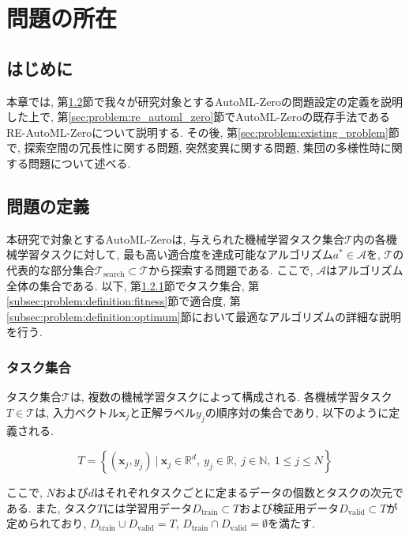\documentclass[11pt,oneside,openany,report]{jsbook}
\begin{document}
\chapter{問題の所在}\label{chap:problem}

\section{はじめに} \label{sec:problem:introduction}
本章では, 第\ref{sec:problem:definition}節で我々が研究対象とするAutoML-Zeroの問題設定の定義を説明した上で, 第\ref{sec:problem:re_automl_zero}節でAutoML-Zeroの既存手法であるRE-AutoML-Zeroについて説明する. その後, 第\ref{sec:problem:existing_problem}節で, 探索空間の冗長性に関する問題, 突然変異に関する問題, 集団の多様性時に関する問題について述べる.

\section{問題の定義} \label{sec:problem:definition}

本研究で対象とするAutoML-Zeroは, 与えられた機械学習タスク集合$\mathcal{T}$内の各機械学習タスクに対して, 最も高い適合度を達成可能なアルゴリズム$a^\ast \in \mathcal{A}$を, $\mathcal{T}$の代表的な部分集合$\mathcal{T}_\mathrm{search} \subset \mathcal{T}$から探索する問題である. ここで, $\mathcal{A}$はアルゴリズム全体の集合である. 以下, 第\ref{subsec:problem:definition:tasksets}節でタスク集合, 第\ref{subsec:problem:definition:fitness}節で適合度, 第\ref{subsec:problem:definition:optimum}節において最適なアルゴリズムの詳細な説明を行う.

\subsection{タスク集合}\label{subsec:problem:definition:tasksets}

タスク集合$\mathcal{T}$は, 複数の機械学習タスクによって構成される. 各機械学習タスク$T \in \mathcal{T}$は, 入力ベクトル$\bm{x}_j$と正解ラベル$y_j$の順序対の集合であり, 以下のように定義される.

$$
  T = \left\{\left(\bm{x}_j, y_j \right) \ |\ \bm{x}_j \in \mathbb{R}^{d},\ y_j \in \mathbb{R},\ j \in \mathbb{N},\ 1 \le j \le N \right\}
$$

\noindent
ここで, $N$および$d$はそれぞれタスクごとに定まるデータの個数とタスクの次元である. また, タスク$T$には学習用データ$D_\mathrm{train} \subset T$および検証用データ$D_\mathrm{valid} \subset T$が定められており, $D_\mathrm{train} \cup D_\mathrm{valid} = T $, $D_\mathrm{train} \cap D_\mathrm{valid} = \emptyset$を満たす.
\end{document}
